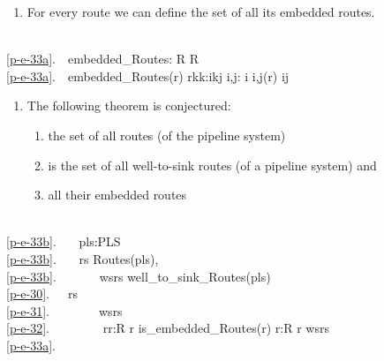 
\begin{enumerate}\setei
\item \label{p-e-33a} For every route we can define the set of all its
                      embedded routes. 
\savei\end{enumerate} 

\bp
\>\ \\
\ref{p-e-33a}.\ \ embedded\_Routes: R {\RIGHTARROW} R\\
\ref{p-e-33a}.\ \ embedded\_Routes(r) {\IS} {\LBRACE}{\LANGLE}r{\LBRACKET}k{\RBRACKET}{\BAR}k:i{\LEQ}k{\LEQ}j{\RANGLE} {\BAR} i,j: i {\LBRACE}i,j{\RBRACE}{\SUBSETEQ}(r) {\WEDGE} i{\LEQ}j{\RBRACE}\ \ 
\ep


\begin{enumerate}\setei
\item \label{p-e-33b} The following theorem is conjectured:
\begin{enumerate}
\item \label{p-e-30}  the set of all routes  (of the pipeline system)
\item \label{p-e-31}  is the set of all well-to-sink routes (of a
                      pipeline system) and 
\item \label{p-e-32}  all their embedded routes
\end{enumerate}
\savei\end{enumerate}

\bp
\>\ \\
\ref{p-e-33b}.\ \ \ {\ALL} pls:PLS {\RDOT}\\
\ref{p-e-33b}.\ \ \  rs {\EQ} Routes(pls),\\
\ref{p-e-33b}.\ \ \ \ \ \ \ wsrs {\EQ} well\_to\_sink\_Routes(pls) \\
\ref{p-e-30}.\ \ \ rs {\EQ} \\
\ref{p-e-31}.\ \ \ \ \ \ \ \ wsrs {\UNION}\\
\ref{p-e-32}.\ \ \ \ \ \ \ \ {\UNION} {\LBRACE}{\LBRACE}r{\PRIM}{\BAR}r{\PRIM}:R {\RDOT} r{\PRIM} {\ISIN} is\_embedded\_Routes(r{\PRIM}{\PRIM}){\RBRACE} {\BAR} r{\PRIM}{\PRIM}:R {\RDOT} r{\PRIM}{\PRIM} {\ISIN} wsrs{\RBRACE}\\
\ref{p-e-33a}.\ \ \ \kw{end}
\ep

